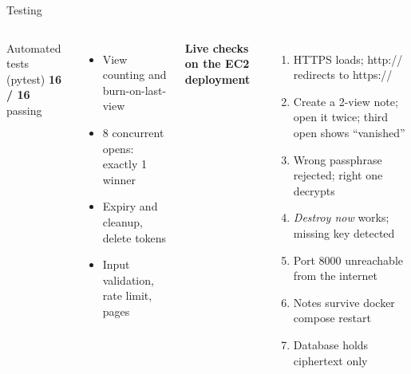 \documentclass[aspectratio=169,11pt]{beamer}
\newcommand{\code}[1]{{\ttfamily\small #1}}
\begin{document}
\begin{frame}{Testing}
  \begin{columns}[T]
    \begin{block}{Automated tests (pytest)}
      \centering\vspace{2pt}
      {\Huge\bfseries\color{okgreen} 16 / 16}\\[2pt]
      \small passing
    \end{block}
    \small
    \begin{itemize}
      \item View counting and burn-on-last-view
      \item 8 concurrent opens: exactly 1 winner
      \item Expiry and cleanup, delete tokens
      \item Input validation, rate limit, pages
    \end{itemize}
    \textbf{Live checks on the EC2 deployment}
    \small
    \begin{enumerate}
      \item HTTPS loads; \code{http://} redirects to \code{https://}
      \item Create a 2-view note; open it twice; third open shows ``vanished''
      \item Wrong passphrase rejected; right one decrypts
      \item \emph{Destroy now} works; missing key detected
      \item Port 8000 unreachable from the internet
      \item Notes survive \code{docker compose restart}
      \item Database holds ciphertext only
    \end{enumerate}
  \end{columns}
\end{frame}
\end{document}
